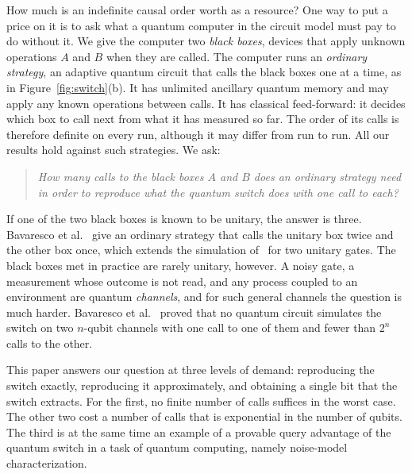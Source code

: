 \documentclass[11pt,letterpaper]{article}
\theoremstyle{definition}\newtheorem{definition}[theorem]{Definition}
\newcommand{\reffig}[1]{Figure~\ref{#1}}
\begin{document}
How much is an indefinite causal order worth as a resource? One way to
put a price on it is to ask what a quantum computer in the circuit
model must pay to do without it. We give the computer two \emph{black
boxes}, devices that apply unknown operations $A$ and $B$ when they are
called. The computer runs an \emph{ordinary strategy}, an adaptive
quantum circuit that calls the black boxes one at a time, as in
\reffig{fig:switch}(b). It has unlimited ancillary quantum memory and
may apply any known operations between calls. It has classical
feed-forward: it decides which box to call next from what it has
measured so far. The order of its calls is therefore definite on every
run, although it may differ from run to run. All our results hold
against such strategies. We ask:\nopagebreak
\begin{quote}
\emph{How many calls to the black boxes $A$ and $B$ does an ordinary
strategy need in order to reproduce what the quantum switch does with
one call to each?}
\end{quote}

If one of the two black boxes is known to be unitary, the answer is
three. Bavaresco et al.~\cite[Theorem~1]{bavaresco2025} give an
ordinary strategy that calls the unitary box twice and the other box
once, which extends the simulation of~\cite{chiribella2013} for two
unitary gates. The black boxes met in practice are rarely unitary,
however. A noisy gate, a measurement whose outcome is not read, and any
process coupled to an environment are quantum \emph{channels}, and for
such general channels the question is much harder. Bavaresco et
al.~\cite{bavaresco2025} proved that no quantum circuit simulates the
switch on two $n$-qubit channels with one call to one of them and fewer
than $2^n$ calls to the other.

This paper answers our question at three levels of demand: reproducing
the switch exactly, reproducing it approximately, and obtaining a
single bit that the switch extracts. For the first, no finite number of
calls suffices in the worst case. The other two cost a number of calls
that is exponential in the number of qubits. The third is at the same
time an example of a provable query advantage of the quantum switch in
a task of quantum computing, namely noise-model characterization.
\end{document}
